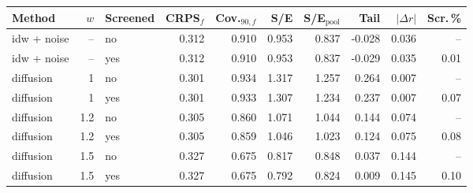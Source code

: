 \begin{tabular}{lrlrrrrrrr}
\toprule
Method & $w$ & Screened & CRPS$_f$ & Cov.$_{90,f}$ & S/E & S/E$_\mathrm{pool}$ & Tail & $|\Delta r|$ & Scr.\,\% \\
\midrule
idw + noise & -- & no & 0.312 & 0.910 & 0.953 & 0.837 & -0.028 & 0.036 & -- \\
idw + noise & -- & yes & 0.312 & 0.910 & 0.953 & 0.837 & -0.029 & 0.035 & 0.01 \\
diffusion & 1 & no & 0.301 & 0.934 & 1.317 & 1.257 & 0.264 & 0.007 & -- \\
diffusion & 1 & yes & 0.301 & 0.933 & 1.307 & 1.234 & 0.237 & 0.007 & 0.07 \\
diffusion & 1.2 & no & 0.305 & 0.860 & 1.071 & 1.044 & 0.144 & 0.074 & -- \\
diffusion & 1.2 & yes & 0.305 & 0.859 & 1.046 & 1.023 & 0.124 & 0.075 & 0.08 \\
diffusion & 1.5 & no & 0.327 & 0.675 & 0.817 & 0.848 & 0.037 & 0.144 & -- \\
diffusion & 1.5 & yes & 0.327 & 0.675 & 0.792 & 0.824 & 0.009 & 0.145 & 0.10 \\
\bottomrule
\end{tabular}
